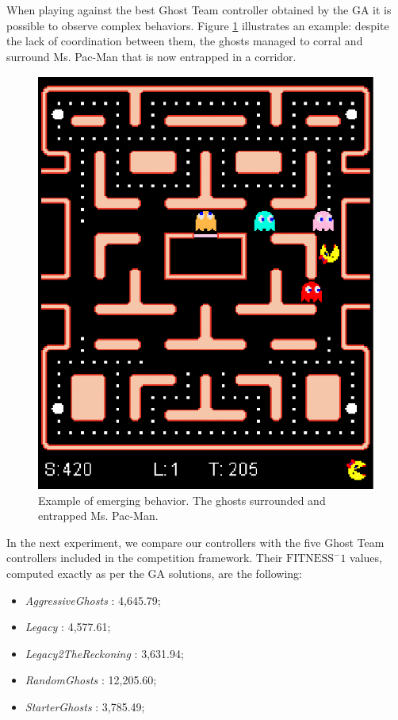\documentclass{llncs}
\begin{document}
When playing against the best Ghost Team controller obtained by the GA it is possible to observe complex behaviors. Figure \ref{fig:GA_Ghost_Behavior} illustrates an example: despite the lack of coordination between them, the ghosts managed to corral and surround Ms. Pac-Man that is now entrapped in a corridor.

\begin{figure}[ht]
	\begin{center}
		\includegraphics[scale=0.45]{img/ghost_corral.eps}
		\caption{Example of emerging behavior. The ghosts surrounded and entrapped Ms. Pac-Man.
		\label{fig:GA_Ghost_Behavior}}
	\end{center}
\end{figure}

In the next experiment, we compare our controllers with the five Ghost Team controllers included in the competition framework. Their $\mathrm{FITNESS}^-1$ values, computed exactly as per the GA solutions, are the following:

\begin{itemize}
	\item \textit{AggressiveGhosts} : 4,645.79;
	\item \textit{Legacy} : 4,577.61;
	\item \textit{Legacy2TheReckoning} : 3,631.94;
	\item \textit{RandomGhosts} : 12,205.60;
	\item \textit{StarterGhosts} : 3,785.49;
\end{itemize}
\end{document}
